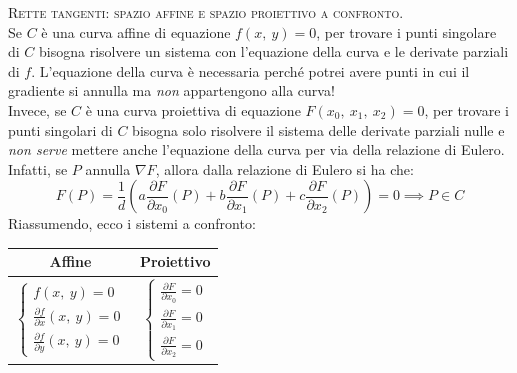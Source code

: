 \begin{observe} \textsc{Rette tangenti: spazio affine e spazio proiettivo a confronto.}\\
	Se $C$ è una curva affine di equazione $f\left(x,\ y\right)=0$, per trovare i punti singolare di $C$ bisogna risolvere un sistema con l'equazione della curva e le derivate parziali di $f$. L'equazione della curva è necessaria perché potrei avere punti in cui il gradiente si annulla ma \textit{non} appartengono alla curva!\\
	Invece, se $C$ è una curva proiettiva di equazione $F\left(x_0,\ x_1,\ x_2\right)=0$, per trovare i punti singolari di $C$ bisogna solo risolvere il sistema delle derivate parziali nulle e \textit{non serve} mettere anche l'equazione della curva per via della relazione di Eulero. Infatti, se $P$ annulla $\nabla F$, allora dalla relazione di Eulero si ha che:
		\begin{equation*}
			F\left(P\right)=\frac{1}{d}\left( a\frac{\partial{F}}{\partial{x_0}}\left(P\right) + b\frac{\partial{F}}{\partial{x_1}}\left(P\right) + c\frac{\partial{F}}{\partial{x_2}}\left(P\right) \right) = 0 \implies P\in C
		\end{equation*}
	Riassumendo, ecco i sistemi a confronto:
		\begin{center}
			\begin{tabular}{c|c}
				Affine & Proiettivo \\
				\hline
				$\displaystyle \begin{cases}
					f\left(x,\ y\right)=0 \\		\frac{\partial{f}}{\partial{x}}\left(x,\ y\right)=0\\	\frac{\partial{f}}{\partial{y}}\left(x,\ y\right)=0
				\end{cases}$ & $\displaystyle \begin{cases}
					\frac{\partial{F}}{\partial{x_0}}=0\\	\frac{\partial{F}}{\partial{x_1}}=0\\	\frac{\partial{F}}{\partial{x_2}}=0
				\end{cases}$
			\end{tabular}
		\end{center}
\end{observe}

